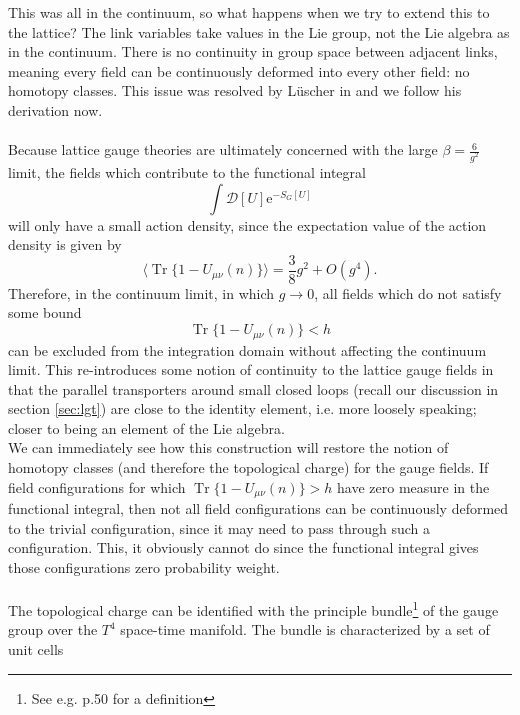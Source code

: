 \documentclass[a4paper,10pt]{article}
\begin{document}
This was all in the continuum, so what happens when we try to extend this to the lattice? The link variables take values in the Lie group, not the Lie algebra as in the continuum. There is no continuity in group space between adjacent links, meaning every field can be continuously deformed into every other field: no homotopy classes. This issue was resolved by Lüscher in \cite{L_scherM1982Tolg} and we follow his derivation now.\\\\Because lattice gauge theories are ultimately concerned with the large $\beta = \frac{6}{g^2}$ limit, the fields which contribute to the functional integral
\begin{equation*}
\int \mathcal{D}[U] \mathrm{e}^{-S_{G}[U]}
\end{equation*}
will only have a small action density, since the expectation value of the action density is given by
\begin{equation}\label{eq:actionDensityExpVal}
\langle\operatorname{Tr}\{1-U_{\mu \nu}(n)\}\rangle=\frac{3}{8} g^{2}+O\left(g^{4}\right).
\end{equation}
Therefore, in the continuum limit, in which $g\rightarrow 0$, all fields which do not satisfy some bound 
\begin{equation}\label{eq:SmoothnessBound_topCharge}
\operatorname{Tr}\{1-U_{\mu \nu}(n)\} < h
\end{equation}
can be excluded from the integration domain without affecting the continuum limit. This re-introduces some notion of continuity to the lattice gauge fields in that the parallel transporters around small closed loops (recall our discussion in section \ref{sec:lgt}) are close to the identity element, i.e. more loosely speaking; closer to being an element of the Lie algebra.\\We can immediately see how this construction will restore the notion of homotopy classes (and therefore the topological charge) for the gauge fields. If field configurations  for which $\operatorname{Tr}\{1-U_{\mu \nu}(n)\} > h$ have zero measure in the functional integral, then not all field configurations can be continuously deformed to the trivial configuration, since it may need to pass through such a configuration. This, it obviously cannot do since the functional integral gives those configurations zero probability weight.\\\\The topological charge can be identified with the principle bundle\footnote{See e.g. \cite{diffGeom} p.50 for a definition} of the gauge group over the $T^4$  space-time manifold. The bundle is characterized by a set of unit cells 
\end{document}
